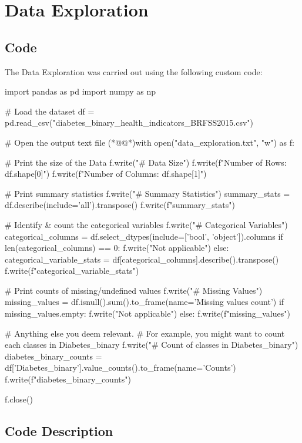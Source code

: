 \documentclass[11pt]{article}
\begin{document}
\section{Data Exploration}
\subsection{{Code}}
The Data Exploration was carried out using the following custom code:

\begin{python}


import pandas as pd
import numpy as np

# Load the dataset
df = pd.read_csv("diabetes_binary_health_indicators_BRFSS2015.csv")

# Open the output text file
(*@@*)with open("data_exploration.txt", "w") as f:

  # Print the size of the Data
  f.write("# Data Size\n")
  f.write(f"Number of Rows: {df.shape[0]}\n")
  f.write(f"Number of Columns: {df.shape[1]}\n\n")

  # Print summary statistics
  f.write("# Summary Statistics\n")
  summary_stats = df.describe(include='all').transpose()
  f.write(f"{summary_stats}\n\n")

  # Identify & count the categorical variables
  f.write("# Categorical Variables\n")
  categorical_columns = df.select_dtypes(include=['bool', 'object']).columns
  if len(categorical_columns) == 0:
    f.write("Not applicable\n\n")
  else:
    categorical_variable_stats = df[categorical_columns].describe().transpose()
    f.write(f"{categorical_variable_stats}\n\n")

  # Print counts of missing/undefined values
  f.write("# Missing Values\n")
  missing_values = df.isnull().sum().to_frame(name='Missing values count')
  if missing_values.empty:
    f.write("Not applicable\n\n")
  else:
    f.write(f"{missing_values}\n\n")

  # Anything else you deem relevant. 
  # For example, you might want to count each classes in Diabetes_binary
  f.write("# Count of classes in Diabetes_binary\n")
  diabetes_binary_counts = df['Diabetes_binary'].value_counts().to_frame(name='Counts')
  f.write(f"{diabetes_binary_counts}\n\n")

f.close()


\end{python}

\subsection{Code Description}
\end{document}
